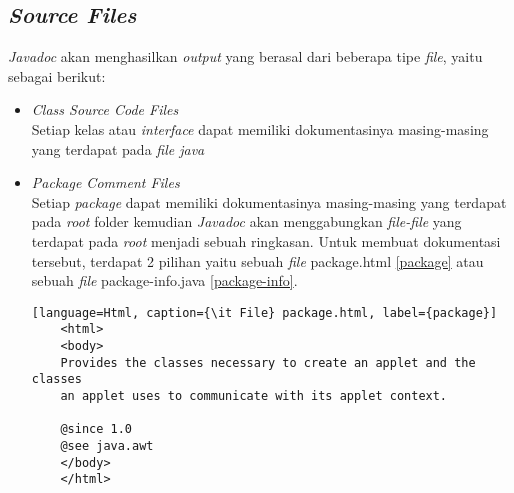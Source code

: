\subsection{\textit{Source Files}}
\label{sec:source-files}
{\it Javadoc} akan menghasilkan {\it output} yang berasal dari beberapa tipe {\it file}, yaitu sebagai berikut:
\begin{itemize}
	\item {\it Class Source Code Files}\\
	Setiap kelas atau {\it interface} dapat memiliki dokumentasinya masing-masing yang terdapat pada {\it file java}
	\item {\it Package Comment Files}\\
	Setiap {\it package} dapat memiliki dokumentasinya masing-masing yang terdapat pada {\it root} folder kemudian {\it Javadoc} akan menggabungkan {\it file-file} yang terdapat pada {\it root} menjadi sebuah ringkasan. Untuk membuat dokumentasi tersebut, terdapat 2 pilihan yaitu sebuah {\it file} package.html \ref{package} atau sebuah {\it file} package-info.java \ref{package-info}.
	\begin{lstlisting}[language=Html, caption={\it File} package.html, label={package}]
	<html>
	<body>
	Provides the classes necessary to create an applet and the classes
	an applet uses to communicate with its applet context.
	
	@since 1.0
	@see java.awt
	</body>
	</html>
	\end{lstlisting}
	

\end{itemize}
